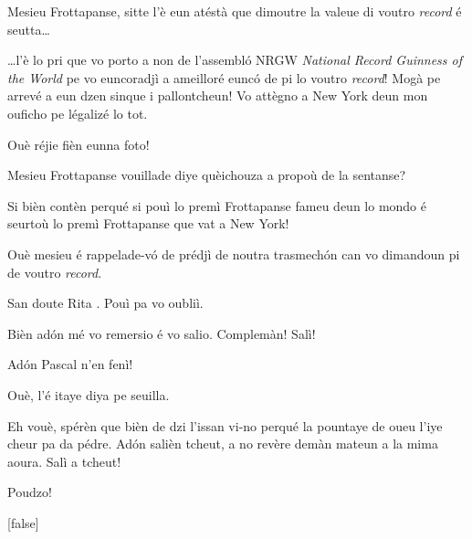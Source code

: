\begin{drama}
\Tissotspeaks Mesieu Frottapanse, sitte l’è eun atéstà que dimoutre la valeue di voutro \textit{record} é seutta\ldots


\Tissotspeaks \ldots l’è lo pri que vo porto a non de l’assembló NRGW \textit{National Record Guinness of the World} pe vo euncoradjì a ameilloré eunc\'o de pi lo voutro \textit{record}!  Mogà pe arrevé a eun dzen sinque i pallontcheun! Vo attègno a New York deun mon ouficho pe légalizé lo tot.

\Ritaspeaks Ouè réjie fièn eunna foto!


\Ritaspeaks Mesieu Frottapanse vouillade diye quèichouza a propoù de la sentanse?

\Cienspeaks Si bièn contèn perqué si pouì lo premì Frottapanse fameu deun lo mondo é seurtoù lo premì Frottapanse que vat a New York!

\Ritaspeaks Ouè mesieu é rappelade-v\'o de prédjì de noutra trasmechón can vo dimandoun pi de voutro \textit{record}.

\Cienspeaks San doute Rita \ok. Pouì pa vo oubliì.

\Ritaspeaks  Bièn ad\'on mé vo remersio é vo salio. Complemàn! Salì!


\Ritaspeaks Adón Pascal n'en fenì!

\Pascalspeaks Ouè, l’é itaye diya pe seuilla.

\Ritaspeaks Eh vouè, spérèn que bièn de dzi l’issan vi-no perqué la pountaye de oueu l’iye cheur pa da pédre. Adón salièn tcheut, a no revère demàn mateun a la mima aoura. Salì a tcheut!

\Pascalspeaks Poudzo!

[false]

\ridocliou

\DeriLeRido


\end{drama}
